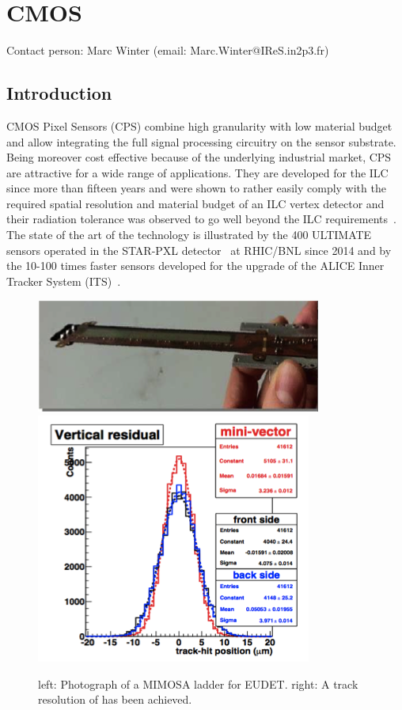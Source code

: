 \section{CMOS}
Contact person: Marc Winter (email: Marc.Winter@IReS.in2p3.fr)
\subsection{Introduction}
CMOS Pixel Sensors (CPS) combine high granularity with low material
budget and allow integrating the full signal processing circuitry on
the sensor substrate. Being moreover cost effective because of the
underlying industrial market, CPS are attractive for a wide range of
applications. They are developed for the ILC since more than fifteen
years and were shown to rather easily comply with the required spatial
resolution and material budget of an ILC vertex detector and their
radiation tolerance was observed to go well beyond the ILC requirements~\cite{Behnke:2013lya}. The state of the art of the technology is illustrated
by the 400 ULTIMATE sensors operated in the STAR-PXL detector~\cite{Greiner201168}
at RHIC/BNL since 2014 and by the 10-100 times faster
sensors developed for the upgrade of the ALICE Inner Tracker System
(ITS)~\cite{0954-3899-41-8-087002}.

\begin{figure}[hb]
	\centering
	\includegraphics[width=.5\linewidth]{VertexDetector/CMOS/Ladder}
	\includegraphics[width=.34\linewidth]{VertexDetector/CMOS/trackResolution.png}
	\caption{left: Photograph of a MIMOSA ladder for EUDET. right: A track resolution of \unit[3]{\micron} has been achieved.}
	\label{fig:VertexDetector:CMOS}
\end{figure}


